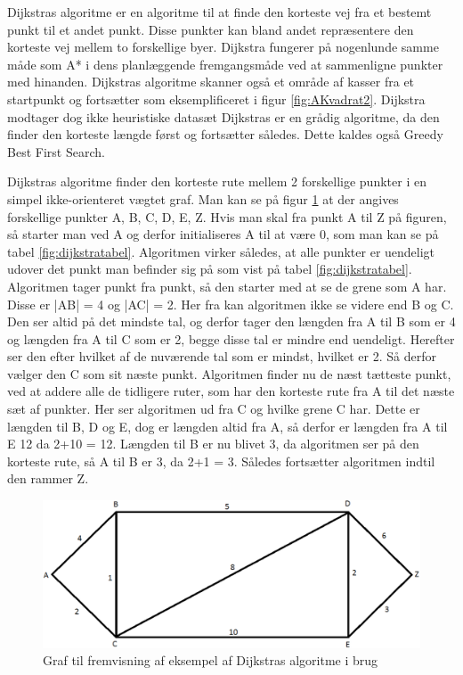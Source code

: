Dijkstras algoritme er en algoritme til at finde den korteste vej fra et bestemt punkt til et andet punkt. Disse punkter kan bland andet repræsentere den korteste vej mellem to forskellige byer. Dijkstra fungerer på nogenlunde samme måde som A* i dens planlæggende fremgangsmåde ved at sammenligne punkter med hinanden. Dijkstras algoritme skanner også et område af kasser fra et startpunkt og fortsætter som eksemplificeret i figur \ref{fig:AKvadrat2}. Dijkstra modtager dog ikke heuristiske datasæt Dijkstras er en grådig algoritme, da den finder den korteste længde først og fortsætter således.\cite{DMATBOGEN} Dette kaldes også Greedy Best First Search.

\vspace{5mm}

Dijkstras algoritme finder den korteste rute mellem 2 forskellige punkter i en simpel ikke-orienteret vægtet graf. Man kan se på figur \ref{fig:dijkstrasgraf} at der angives forskellige punkter {A, B, C, D, E, Z}. Hvis man skal fra punkt A til Z på figuren, så starter man ved A og derfor initialiseres A til at være 0, som man kan se på tabel \ref{fig:dijkstratabel}. Algoritmen virker således, at alle punkter er uendeligt udover det punkt man befinder sig på som vist på tabel \ref{fig:dijkstratabel}. Algoritmen tager punkt fra punkt, så den starter med at se de grene som A har. Disse er |AB| = 4 og |AC| = 2. Her fra kan algoritmen ikke se videre end B og C. Den ser altid på det mindste tal, og derfor tager den længden fra A til B som er 4 og længden fra A til C som er 2, begge disse tal er mindre end uendeligt. Herefter ser den efter hvilket af de nuværende tal som er mindst, hvilket er 2. Så derfor vælger den C som sit næste punkt. Algoritmen finder nu de næst tætteste punkt, ved at addere alle de tidligere ruter, som har den korteste rute fra A til det næste sæt af punkter. Her ser algoritmen ud fra C og hvilke grene C har. Dette er længden til B, D og E, dog er længden altid fra A, så derfor er længden fra A til E 12 da 2+10 = 12. Længden til B er nu blivet 3, da algoritmen ser på den korteste rute, så A til B er 3, da 2+1 = 3. Således fortsætter algoritmen indtil den rammer Z.\cite{DMATBOGEN}

\begin{figure}[ht!]
\begin{adjustbox}{width=1.2\textwidth,center=\textwidth}
\centering
\includegraphics[width=1.2\textwidth]{Pictures/Teoriafsnit/Figurfiler/dijkstrasgraf.png}
\end{adjustbox}
\label{fig:dijkstrasgraf}
\caption{Graf til fremvisning af eksempel af Dijkstras algoritme i brug}
\end{figure}

